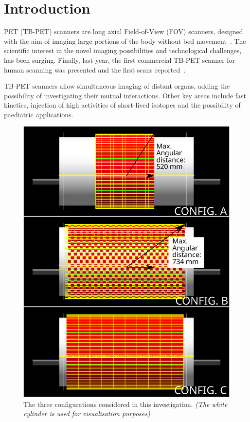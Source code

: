 \documentclass{IEEEtran}
\begin{document}
\vspace{-0.2cm}

\section{Introduction}
 PET (TB-PET) scanners are long axial Field-of-View (FOV) scanners, designed with the aim of imaging large portions of the body without bed movement~\cite{Cherry2018Total-BodyCare., Moskal2019FeasibilityTomograph}. The scientific interest in the novel imaging possibilities and technological challenges, has been surging. Finally, last year, the first commercial TB-PET scanner for human scanning was presented and the first scans reported~\cite{Leung2018PerformanceScanner, Badawi2019FirstScanner.}.

TB-PET scanners allow simultaneous imaging of distant organs, adding the possibility of investigating their mutual interactions. Other key areas include fast kinetics, injection of high activities of short-lived isotopes and the possibility of paediatric applications.

\begin{figure}
    \vspace{-0.2cm}
    
    \centering
    \includegraphics[width=0.85\linewidth]{dfd.png}
    \caption{The three configurations considered in this investigation. \textit{(The white cylinder is used for visualisation purposes)}}
    \label{fig:configs}
    
    \vspace{-0.2cm}
\end{figure}
\end{document}
